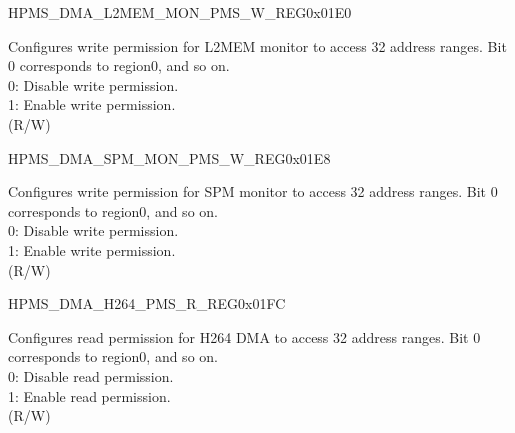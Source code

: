 \begin{register}{H}{PMS\_DMA\_L2MEM\_MON\_PMS\_W\_REG}{0x01E0}\label{regdesc:PMSDMAL2MEMMONPMSWREG}
%
\regnewline%
\begin{regdesc}\begin{reglist}
\label{fielddesc:PMSDMAL2MEMMONWPMS}\item [PMS\_DMA\_L2MEM\_MON\_W\_PMS] Configures write permission for L2MEM monitor to access 32 address ranges. Bit 0 corresponds to region0, and so on.\\
0: Disable write permission.\\
1: Enable write permission.\\ (R/W)
\end{reglist}\end{regdesc}
\end{register}


\begin{register}{H}{PMS\_DMA\_SPM\_MON\_PMS\_W\_REG}{0x01E8}\label{regdesc:PMSDMASPMMONPMSWREG}
%
\regnewline%
\begin{regdesc}\begin{reglist}
\label{fielddesc:PMSDMASPMMONWPMS}\item [PMS\_DMA\_SPM\_MON\_W\_PMS] Configures write permission for SPM monitor to access 32 address ranges. Bit 0 corresponds to region0, and so on.\\
0: Disable write permission.\\
1: Enable write permission.\\ (R/W)
\end{reglist}\end{regdesc}
\end{register}


\begin{register}{H}{PMS\_DMA\_H264\_PMS\_R\_REG}{0x01FC}\label{regdesc:PMSDMAH264PMSRREG}
%
\regnewline%
\begin{regdesc}\begin{reglist}
\label{fielddesc:PMSDMAH264RPMS}\item [PMS\_DMA\_H264\_R\_PMS] Configures read permission for H264 DMA to access 32 address ranges. Bit 0 corresponds to region0, and so on.\\
0: Disable read permission.\\
1: Enable read permission.\\ (R/W)
\end{reglist}\end{regdesc}
\end{register}


